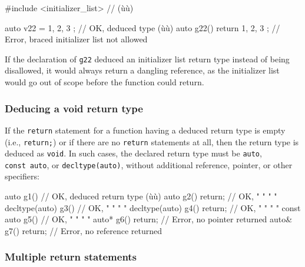 \begin{emcppslisting}
#include <initializer_list>  // (ù{}ù)

auto v22 = { 1, 2, 3 };            // OK, deduced type (ù{}ù)
auto g22() { return { 1, 2, 3 }; } // Error, braced initializer list not allowed
\end{emcppslisting}
    

\noindent If the declaration of \lstinline!g22! deduced an initializer list return
type instead of being disallowed, it would always return a dangling
reference, as the initializer list would go out of scope before the
function could return.

\subsubsection[Deducing a \lstinline!void! return type]{Deducing a {\SubsubsecCode void} return type}\label{deducing-a-void-return-type}

If the \lstinline!return! statement for a function having a deduced return
type is empty (i.e., \lstinline!return;!) or if there are no
\lstinline!return! statements at all, then the return type is deduced as
\lstinline!void!. In such cases, the declared return type must be
\lstinline!auto!, \lstinline!const!~\lstinline!auto!, or \lstinline!decltype(auto)!,
without additional reference, pointer, or other specifiers:

\begin{emcppslisting}[emcppsstandards={c++14}]
auto           g1() { }          // OK, deduced return type (ù{}ù)
auto           g2() { return; }  // OK,    "       "     "     "
decltype(auto) g3() { }          // OK,    "       "     "     "
decltype(auto) g4() { return; }  // OK,    "       "     "     "
const auto     g5() { }          // OK,    "       "     "     "
auto*          g6() { return; }  // Error, no pointer returned
auto&          g7() { return; }  // Error, no reference returned
\end{emcppslisting}
    

\subsubsection[Multiple \lstinline!return! statements]{Multiple {\SubsubsecCode return} statements}\label{multiple-return-statements}

